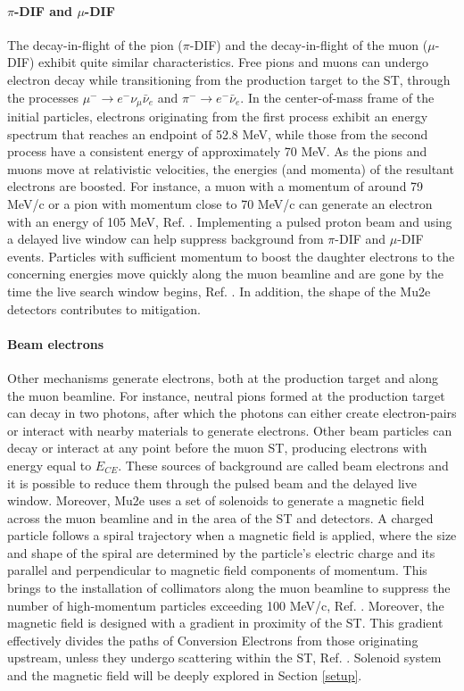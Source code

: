 \paragraph{$\pi$-DIF and $\mu$-DIF}
The decay-in-flight of the pion ($\pi$-DIF) and the decay-in-flight of the muon ($\mu$-DIF) exhibit quite similar characteristics. Free pions and muons can 
undergo electron decay while transitioning from the production target to the ST, through the processes $\mu^- \rightarrow e^- \nu_\mu \bar{\nu}_e$ and $\pi^- \rightarrow e^- \bar{\nu}_e$. In the center-of-mass frame of the initial particles, electrons originating from the first process exhibit an energy spectrum that reaches an endpoint of 52.8 MeV, while those from the second process have a consistent energy of approximately 70 MeV. As the pions and muons move at relativistic velocities, the energies (and momenta) of the resultant electrons are boosted. For instance, a muon with a momentum of around 79 MeV/c or a pion with momentum close to 70 MeV/c can generate an electron with an energy of 105 MeV, Ref. \cite{bartoszek2015mu2e}. Implementing a pulsed proton beam and using a delayed live window can help suppress background from $\pi$-DIF and $\mu$-DIF events. Particles with sufficient momentum to boost the daughter electrons to the concerning energies move quickly along the muon beamline and are gone by the time the live search window begins, Ref. \cite{bobbb}. In addition, the shape of the Mu2e detectors contributes to mitigation.
\paragraph{Beam electrons}\label{beamelectrons}
Other mechanisms generate electrons, both at the production target and along the muon beamline. For instance, neutral pions formed at the production target can decay in two photons, after which the photons can either create electron-pairs or interact with nearby materials to generate electrons. Other beam particles can decay or interact at any point before the muon ST, producing electrons with energy equal to $E_{CE}$. These sources of background are called beam electrons and it is possible to reduce them through the pulsed beam and the delayed live window. Moreover, Mu2e uses a set of solenoids to generate a magnetic field across the muon beamline and in the area of the ST and detectors. A charged particle follows a spiral trajectory when a magnetic field is applied, where the size and shape of the spiral are determined by the particle's electric charge and its parallel and perpendicular to magnetic field components of momentum. This brings to the installation of collimators along the muon beamline to suppress the number of high-momentum particles exceeding 100 MeV/c, Ref. \cite{bartoszek2015mu2e}. Moreover, the magnetic field is 
designed with a gradient in proximity of the ST. This gradient effectively divides the paths of Conversion Electrons from those originating upstream, unless they undergo scattering within the ST, Ref. \cite{bobbb}. Solenoid system and the magnetic field will be deeply explored in Section \ref{setup}.
